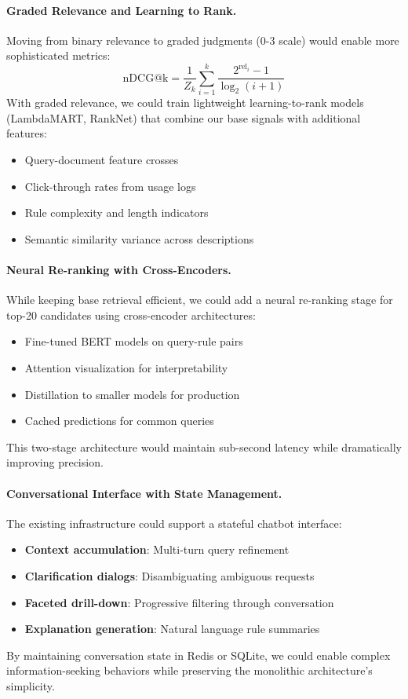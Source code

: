 \paragraph{Graded Relevance and Learning to Rank.} Moving from binary relevance to graded judgments (0-3 scale) would enable more sophisticated metrics:
\[
\text{nDCG@k} = \frac{1}{Z_k} \sum_{i=1}^{k} \frac{2^{\text{rel}_i} - 1}{\log_2(i + 1)}
\]
With graded relevance, we could train lightweight learning-to-rank models (LambdaMART, RankNet) that combine our base signals with additional features:
\begin{itemize}[leftmargin=*,itemsep=2pt,topsep=2pt]
 \item Query-document feature crosses
 \item Click-through rates from usage logs
 \item Rule complexity and length indicators
 \item Semantic similarity variance across descriptions
\end{itemize}

\paragraph{Neural Re-ranking with Cross-Encoders.} While keeping base retrieval efficient, we could add a neural re-ranking stage for top-20 candidates using cross-encoder architectures:
\begin{itemize}[leftmargin=*,itemsep=2pt,topsep=2pt]
 \item Fine-tuned BERT models on query-rule pairs
 \item Attention visualization for interpretability
 \item Distillation to smaller models for production
 \item Cached predictions for common queries
\end{itemize}
This two-stage architecture would maintain sub-second latency while dramatically improving precision.

\paragraph{Conversational Interface with State Management.} The existing infrastructure could support a stateful chatbot interface:
\begin{itemize}[leftmargin=*,itemsep=2pt,topsep=2pt]
 \item \textbf{Context accumulation}: Multi-turn query refinement
 \item \textbf{Clarification dialogs}: Disambiguating ambiguous requests
 \item \textbf{Faceted drill-down}: Progressive filtering through conversation
 \item \textbf{Explanation generation}: Natural language rule summaries
\end{itemize}
By maintaining conversation state in Redis or SQLite, we could enable complex information-seeking behaviors while preserving the monolithic architecture's simplicity.

